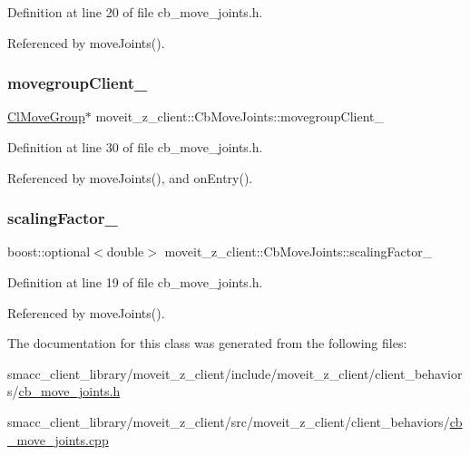 Definition at line 20 of file cb\+\_\+move\+\_\+joints.\+h.



Referenced by move\+Joints().

\mbox{\label{classmoveit__z__client_1_1CbMoveJoints_a2ce2e613b676025766dcd2f01ae50810}} 
\subsubsection{\texorpdfstring{movegroup\+Client\+\_\+}{movegroupClient\_}}
{\footnotesize\ttfamily \hyperlink{classmoveit__z__client_1_1ClMoveGroup}{Cl\+Move\+Group}$\ast$ moveit\+\_\+z\+\_\+client\+::\+Cb\+Move\+Joints\+::movegroup\+Client\+\_\+\hspace{0.3cm}{\ttfamily [protected]}}



Definition at line 30 of file cb\+\_\+move\+\_\+joints.\+h.



Referenced by move\+Joints(), and on\+Entry().

\mbox{\label{classmoveit__z__client_1_1CbMoveJoints_aadb5410711e277fab3a637cb4835fb3b}} 
\subsubsection{\texorpdfstring{scaling\+Factor\+\_\+}{scalingFactor\_}}
{\footnotesize\ttfamily boost\+::optional$<$double$>$ moveit\+\_\+z\+\_\+client\+::\+Cb\+Move\+Joints\+::scaling\+Factor\+\_\+}



Definition at line 19 of file cb\+\_\+move\+\_\+joints.\+h.



Referenced by move\+Joints().



The documentation for this class was generated from the following files\+:\begin{DoxyCompactItemize}
\item 
smacc\+\_\+client\+\_\+library/moveit\+\_\+z\+\_\+client/include/moveit\+\_\+z\+\_\+client/client\+\_\+behaviors/\hyperlink{cb__move__joints_8h}{cb\+\_\+move\+\_\+joints.\+h}\item 
smacc\+\_\+client\+\_\+library/moveit\+\_\+z\+\_\+client/src/moveit\+\_\+z\+\_\+client/client\+\_\+behaviors/\hyperlink{cb__move__joints_8cpp}{cb\+\_\+move\+\_\+joints.\+cpp}\end{DoxyCompactItemize}

